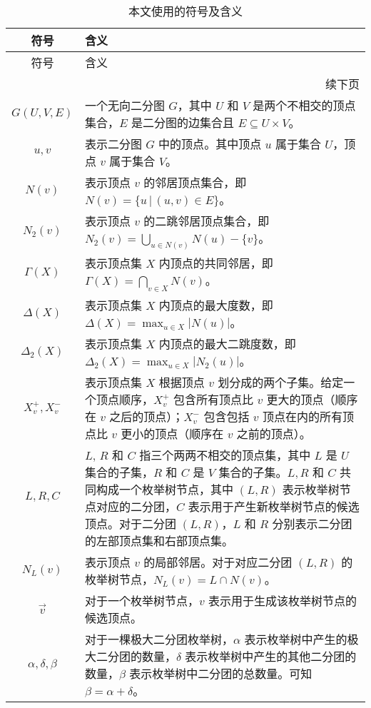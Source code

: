 \begin{longtable}[htbp]{|c|p{12cm}|}
    \caption{本文使用的符号及含义}
    \label{tab:definition} \\
    
    \hline
    符号 & 含义 \\ \hline
    \endfirsthead
    
    \hline
    符号 & 含义 \\ \hline
    \endhead
    
    \hline
    \multicolumn{2}{r}{续下页} \\
    \endfoot
    
    \hline
    \endlastfoot
    
    $G(U,V,E)$ & 一个无向二分图 $G$，其中 $U$ 和 $V$ 是两个不相交的顶点集合，$E$ 是二分图的边集合且 $E \subseteq U \times V$。 \\ \hline
    $u,v$ & 表示二分图 $G$ 中的顶点。其中顶点 $u$ 属于集合 $U$，顶点 $v$ 属于集合 $V$。 \\ \hline
    $N(v)$ & 表示顶点 $v$ 的邻居顶点集合，即 $N(v) = \{u \,|\, (u,v) \in E\}$。 \\ \hline
    $N_2(v)$ & 表示顶点 $v$ 的二跳邻居顶点集合，即 $N_2(v) = \bigcup_{u \in N(v)} N(u) - \{v\}$。 \\ \hline
    $\Gamma(X)$ & 表示顶点集 $X$ 内顶点的共同邻居，即 $\Gamma(X) = \bigcap_{v \in X} N(v)$。 \\ \hline
    $\Delta(X)$ & 表示顶点集 $X$ 内顶点的最大度数，即 $\Delta(X) = \max_{u \in X} |N(u)|$。 \\ \hline
    $\Delta_2(X)$ & 表示顶点集 $X$ 内顶点的最大二跳度数，即 $\Delta_2(X) = \max_{u \in X} |N_2(u)|$。 \\ \hline
    $X_v^+, X_v^-$ & 表示顶点集 $X$ 根据顶点 $v$ 划分成的两个子集。给定一个顶点顺序，$X_v^+$ 包含所有顶点比 $v$ 更大的顶点（顺序在 $v$ 之后的顶点）；$X_v^-$ 包含包括 $v$ 顶点在内的所有顶点比 $v$ 更小的顶点（顺序在 $v$ 之前的顶点）。 \\ \hline
    $L,R,C$ & $L$, $R$ 和 $C$ 指三个两两不相交的顶点集，其中 $L$ 是 $U$ 集合的子集，$R$ 和 $C$ 是 $V$ 集合的子集。$L,R$ 和 $C$ 共同构成一个枚举树节点，其中 $(L,R)$ 表示枚举树节点对应的二分团，$C$ 表示用于产生新枚举树节点的候选顶点。对于二分团 $(L,R)$，$L$ 和 $R$ 分别表示二分团的左部顶点集和右部顶点集。 \\ \hline
    $N_L(v)$ & 表示顶点 $v$ 的局部邻居。对于对应二分团 $(L,R)$ 的枚举树节点，$N_L(v) = L \cap N(v)$。 \\ \hline
    $\vec{v}$ & 对于一个枚举树节点，$v$ 表示用于生成该枚举树节点的候选顶点。 \\ \hline
    $\alpha, \delta, \beta$ & 对于一棵极大二分团枚举树，$\alpha$ 表示枚举树中产生的极大二分团的数量，$\delta$ 表示枚举树中产生的其他二分团的数量，$\beta$ 表示枚举树中二分团的总数量。可知 $\beta = \alpha + \delta$。 \\ \hline
\end{longtable}

